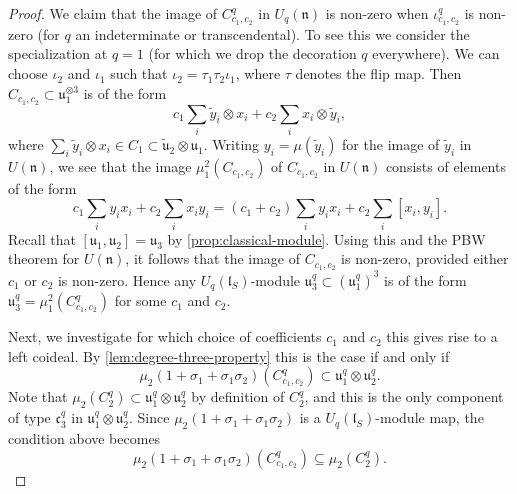 \documentclass[a4paper, 12pt, reqno, english]{amsart}
\numberwithin{equation}{section}
\numberwithin{figure}{section}
\theoremstyle{plain}
\theoremstyle{plain}
\theoremstyle{plain}
\theoremstyle{plain}
\theoremstyle{plain}
\theoremstyle{definition}
\theoremstyle{definition}
\theoremstyle{definition}
\theoremstyle{remark}
\theoremstyle{definition}
\theoremstyle{definition}
\newcommand{\Uqn}{U_q(\mathfrak{n})}
\newcommand{\UqlS}{U_q(\mathfrak{l}_S)}
\newcommand{\liec}{\mathfrak{c}}
\newcommand{\lien}{\mathfrak{n}}
\newcommand{\lieu}{\mathfrak{u}}
\begin{document}
\begin{proof}
We claim that the image of $C^q_{c_1, c_2}$ in $\Uqn$ is non-zero when $\iota^q_{c_1, c_2}$ is non-zero (for $q$ an indeterminate or transcendental).
To see this we consider the specialization at $q = 1$ (for which we drop the decoration $q$ everywhere). We can choose $\iota_2$ and $\iota_1$ such that $\iota_2 = \tau_1 \tau_2 \iota_1$, where $\tau$ denotes the flip map.
Then $C_{c_1, c_2} \subset \lieu_1^{\otimes 3}$ is of the form
\[
c_1 \sum_i \tilde{y}_i \otimes x_i + c_2 \sum_i x_i \otimes \tilde{y}_i,
\]
where $\sum_i \tilde{y}_i \otimes x_i \in C_1 \subset \tilde{\lieu}_2 \otimes \lieu_1$.
Writing $y_i = \mu(\tilde{y}_i)$ for the image of $\tilde{y}_i$ in $U(\lien)$, we see that the image $\mu_1^2(C_{c_1, c_2})$ of $C_{c_1, c_2}$ in $U(\lien)$ consists of elements of the form
\[
c_1 \sum_i y_i x_i + c_2 \sum_i x_i y_i = (c_1 + c_2) \sum_i y_i x_i + c_2 \sum_i [x_i, y_i].
\]
Recall that $[\lieu_1, \lieu_2] = \lieu_3$ by \cref{prop:classical-module}.
Using this and the PBW theorem for $U(\lien)$, it follows that the image of $C_{c_1, c_2}$ is non-zero, provided either $c_1$ or $c_2$ is non-zero.
Hence any $\UqlS$-module $\lieu^q_3 \subset (\lieu^q_1)^3$ is of the form $\lieu^q_3 = \mu_1^2 (C^q_{c_1, c_2})$ for some $c_1$ and $c_2$.

Next, we investigate for which choice of coefficients $c_1$ and $c_2$ this gives rise to a left coideal.
By \cref{lem:degree-three-property} this is the case if and only if
\[
\mu_2 (1 + \sigma_1 + \sigma_1 \sigma_2) (C^q_{c_1, c_2}) \subset \lieu^q_1 \otimes \lieu^q_2.
\]
Note that $\mu_2(C^q_2) \subset \lieu^q_1 \otimes \lieu^q_2$ by definition of $C^q_2$, and this is the only component of type $\liec^q_3$ in $\lieu^q_1 \otimes \lieu^q_2$.
Since $\mu_2 (1 + \sigma_1 + \sigma_1 \sigma_2)$ is a $\UqlS$-module map, the condition above becomes
\begin{equation}
\label{eq:coideal-condition}
\mu_2 (1 + \sigma_1 + \sigma_1 \sigma_2) (C^q_{c_1, c_2}) \subseteq \mu_2(C^q_2).
\end{equation}


\end{proof}
\end{document}
